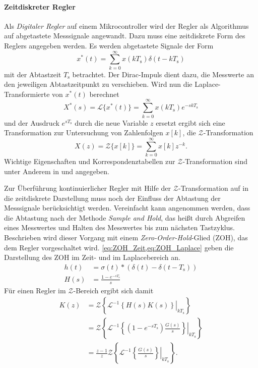 \paragraph{Zeitdiskreter Regler}\label{par:ZeitdiskreterRegler}
Als \emph{Digitaler Regler} auf einem Mikrocontroller wird der Regler als Algorithmus auf abgetastete Messsignale angewandt. Dazu muss eine zeitdiskrete Form des Reglers angegeben werden. Es werden abgetastete Signale der Form \begin{equation}
    x^*(t) = \sum_{k=0}^\infty x(kT_{\mathrm{s}})\delta(t-kT_{\mathrm{s}})
\end{equation} mit der Abtastzeit $T_{\mathrm{s}}$ betrachtet. Der Dirac-Impuls dient dazu, die Messwerte an den jeweiligen Abtastzeitpunkt zu verschieben. Wird nun die Laplace-Transformierte von $x^*(t)$ berechnet 
\begin{equation}
    X^*(s) = \mathcal{L}\{x^*(t)\} = \sum_{k=0}^\infty x(kT_{\mathrm{s}})e^{-skT_{\mathrm{s}}} 
\end{equation}
und der Ausdruck $e^{sT_{\mathrm{s}}}$ durch die neue Variable $z$ ersetzt ergibt sich eine Transformation zur Untersuchung von Zahlenfolgen $x[k]$, die $\mathcal{Z}$-Transformation
\begin{equation}
    X(z) = \mathcal{Z}\{x[k]\} = \sum_{k=0}^\infty x[k]z^{-k}.
\end{equation} Wichtige Eigenschaften und Korrespondenztabellen zur $\mathcal{Z}$-Transformation sind unter Anderem in \cite{mbihiTableZtransforms2018} und \cite[S.~112-114]{unbehauenRegelungstechnikZustandsregelungenDigitale2009} angegeben.

Zur Überführung kontinuierlicher Regler mit Hilfe der $\mathcal{Z}$-Transformation auf in die zeitdiskrete Darstellung muss noch der Einfluss der Abtastung der Messsignale berücksichtigt werden. Vereinfacht kann angenommen werden, dass die Abtastung nach der Methode \emph{Sample and Hold}, das heißt durch Abgreifen eines Messwertes und Halten des Messwertes bis zum nächsten Tastzyklus. Beschrieben wird dieser Vorgang mit einem \emph{Zero-Order-Hold}-Glied (ZOH), das dem Regler vorgeschaltet wird. \cref{eq:ZOH_Zeit,eq:ZOH_Laplace} geben die Darstellung des ZOH im Zeit- und im Laplacebereich an.
\begin{align}
    h(t) &= \sigma(t)*\left(\delta(t) - \delta(t-T_{\mathrm{s}})\right) \label{eq:ZOH_Zeit}\\
    H(s) &= \frac{1 - e^{-sT_{\mathrm{s}}}}{s} \label{eq:ZOH_Laplace}
\end{align}
Für einen Regler im $\mathcal{Z}$-Bereich ergibt sich damit
\begin{equation}
\begin{split}\label{eq:ReglerZBereich}
    K(z) &= \mathcal{Z}\left\{ \left.\mathcal{L}^{-1}\left\{ H(s)K(s) \right\}\right|_{kT_{\mathrm{s}}} \right\} \\
    &= \mathcal{Z}\left\{ \left.\mathcal{L}^{-1}\left\{ (1 - e^{-sT_{\mathrm{s}}})\frac{G(s)}{s} \right\}\right|_{kT_{\mathrm{s}}} \right\} \\
    &= \frac{z-1}{z} \mathcal{Z}\left\{ \mathcal{L}^{-1}\left.\left\{\frac{G(s)}{s}\right\}\right|_{kT_{\mathrm{s}}} \right\}. 
\end{split}
\end{equation}

